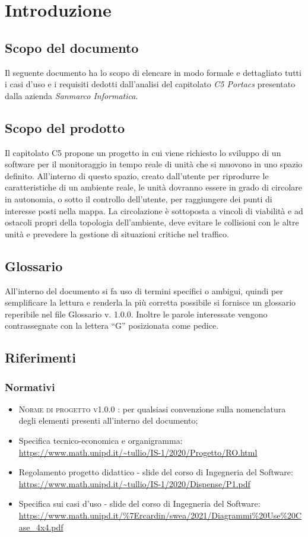 \section{Introduzione}
\subsection{Scopo del documento}
Il seguente documento ha lo scopo di elencare in modo formale e dettagliato tutti i casi d’uso e i requisiti dedotti dall’analisi del capitolato \textit{C5 Portacs} presentato dalla azienda \textit{Sanmarco Informatica}.

\subsection{Scopo del prodotto}
Il capitolato C5 propone un progetto in cui viene richiesto lo sviluppo di un software per il monitoraggio in tempo reale di unità che si muovono in uno spazio definito. All’interno di questo spazio, creato dall’utente per riprodurre le caratteristiche di un ambiente reale, le unità dovranno essere in grado di circolare in autonomia, o sotto il controllo dell’utente, per raggiungere dei punti di interesse posti nella mappa.  La circolazione è sottoposta a vincoli di viabilità e ad ostacoli propri della topologia dell’ambiente, deve evitare le collisioni con le altre unità e prevedere la gestione di situazioni critiche nel traffico.

\subsection{Glossario}
All’interno del documento si fa uso di termini specifici o ambigui, quindi per semplificare la lettura e renderla la più corretta possibile si fornisce un glossario reperibile nel file Glossario v. 1.0.0. Inoltre le parole interessate vengono contrassegnate con la lettera “G” posizionata come pedice.

\subsection{Riferimenti}
\subsubsection{Normativi}
\begin{itemize}
\item \textsc{Norme di progetto v1.0.0 }: per qualsiasi convenzione sulla nomenclatura degli elementi presenti all’interno del documento;
\item Specifica tecnico-economica e organigramma: \\ \url{https://www.math.unipd.it/~tullio/IS-1/2020/Progetto/RO.html}
\item Regolamento progetto didattico - slide del corso di Ingegneria del Software: \\ \url{https://www.math.unipd.it/~tullio/IS-1/2020/Dispense/P1.pdf}
\item Specifica sui casi d'uso - slide del corso di Ingegneria del Software: \\ \url{https://www.math.unipd.it/%7Ercardin/swea/2021/Diagrammi%20Use%20Case_4x4.pdf}
\end{itemize}
